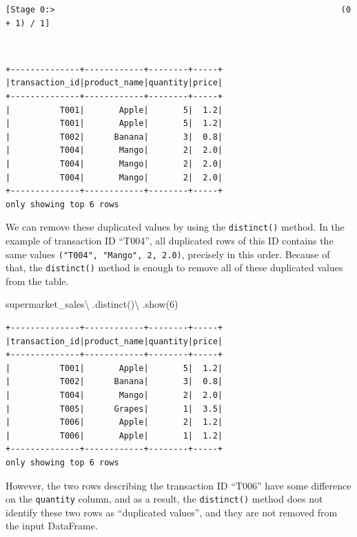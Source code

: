\documentclass[
  11pt,
  letterpaper,
  DIV=11,
  numbers=noendperiod]{scrreprt}
\newenvironment{Shaded}{\begin{snugshade}}{\end{snugshade}}
\newcommand{\DecValTok}[1]{\textcolor[rgb]{0.68,0.00,0.00}{#1}}
\newcommand{\NormalTok}[1]{\textcolor[rgb]{0.00,0.23,0.31}{#1}}
\newcommand{\OperatorTok}[1]{\textcolor[rgb]{0.37,0.37,0.37}{#1}}
\begin{document}
\begin{verbatim}
[Stage 0:>                                                          (0 + 1) / 1]
\end{verbatim}

\begin{verbatim}
                                                                                
\end{verbatim}

\begin{verbatim}
+--------------+------------+--------+-----+
|transaction_id|product_name|quantity|price|
+--------------+------------+--------+-----+
|          T001|       Apple|       5|  1.2|
|          T001|       Apple|       5|  1.2|
|          T002|      Banana|       3|  0.8|
|          T004|       Mango|       2|  2.0|
|          T004|       Mango|       2|  2.0|
|          T004|       Mango|       2|  2.0|
+--------------+------------+--------+-----+
only showing top 6 rows
\end{verbatim}

We can remove these duplicated values by using the \texttt{distinct()}
method. In the example of transaction ID ``T004'', all duplicated rows
of this ID contains the same values
\texttt{("T004",\ "Mango",\ 2,\ 2.0)}, precisely in this order. Because
of that, the \texttt{distinct()} method is enough to remove all of these
duplicated values from the table.

\begin{Shaded}
\begin{Highlighting}[]
\NormalTok{supermarket\_sales}\OperatorTok{\textbackslash{}}
\NormalTok{    .distinct()}\OperatorTok{\textbackslash{}}
\NormalTok{    .show(}\DecValTok{6}\NormalTok{)}
\end{Highlighting}
\end{Shaded}

\begin{verbatim}
+--------------+------------+--------+-----+
|transaction_id|product_name|quantity|price|
+--------------+------------+--------+-----+
|          T001|       Apple|       5|  1.2|
|          T002|      Banana|       3|  0.8|
|          T004|       Mango|       2|  2.0|
|          T005|      Grapes|       1|  3.5|
|          T006|       Apple|       2|  1.2|
|          T006|       Apple|       1|  1.2|
+--------------+------------+--------+-----+
only showing top 6 rows
\end{verbatim}

However, the two rows describing the transaction ID ``T006'' have some
difference on the \texttt{quantity} column, and as a result, the
\texttt{distinct()} method does not identify these two rows as
``duplicated values'', and they are not removed from the input
DataFrame.
\end{document}
